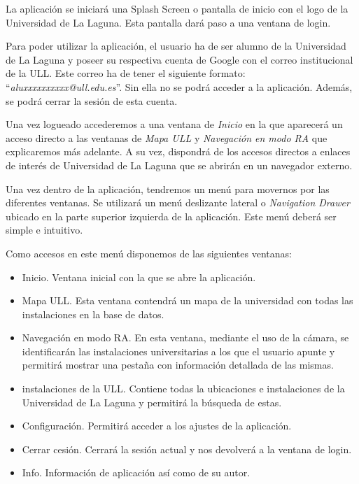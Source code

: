 La aplicación se iniciará una Splash Screen \cite{URL::SplashScreen} o pantalla de inicio con el logo de la Universidad de La Laguna. Esta pantalla dará paso a una ventana de login.

Para poder utilizar la aplicación, el usuario ha de ser alumno de la Universidad de La Laguna y poseer su respectiva cuenta de Google con el correo institucional de la ULL. Este correo ha de tener el siguiente formato: ``\textit{aluxxxxxxxxxx@ull.edu.es}''. Sin ella no se podrá acceder a la aplicación. Además, se podrá cerrar la sesión de esta cuenta.

Una vez logueado accederemos a una ventana de \textit{Inicio} en la que aparecerá un acceso directo a las ventanas de \textit{Mapa ULL} y \textit{Navegación en modo RA} que explicaremos más adelante. A su vez, dispondrá de los accesos directos a enlaces de interés de Universidad de La Laguna que se abrirán en un navegador externo. 

Una vez dentro de la aplicación, tendremos un menú para movernos por las diferentes ventanas. Se utilizará un menú deslizante lateral o \textit{Navigation Drawer} \cite{URL::NavigationDraw} ubicado en la parte superior izquierda de la aplicación. Este menú deberá ser simple e intuitivo.

Como accesos en este menú disponemos de las siguientes ventanas:

\begin{itemize}
    \item Inicio. Ventana inicial con la que se abre la aplicación.
    \item Mapa ULL. Esta ventana contendrá un mapa de la universidad con todas las instalaciones en la base de datos. 
    \item Navegación en modo RA. En esta ventana, mediante el uso de la cámara, se identificarán las instalaciones universitarias a los que el usuario apunte y permitirá mostrar una pestaña con información detallada de las mismas.
    \item instalaciones de la ULL. Contiene todas la ubicaciones e instalaciones de la Universidad de La Laguna y permitirá la búsqueda de estas. 
    \item Configuración. Permitirá acceder a los ajustes de la aplicación.
    \item Cerrar cesión. Cerrará la sesión actual y nos devolverá a la ventana de login.
    \item Info. Información de aplicación así como de su autor.
\end{itemize}

